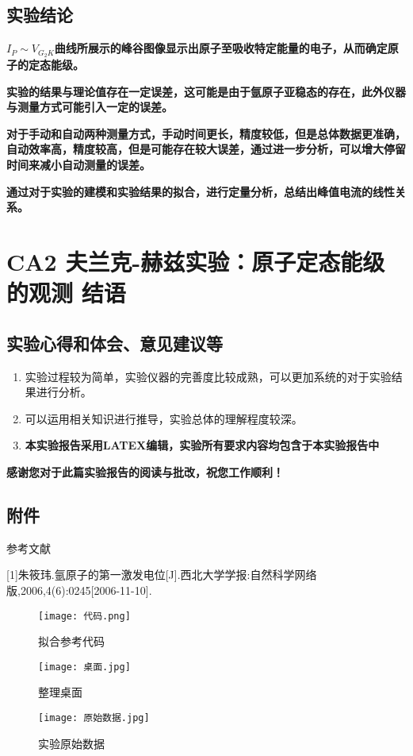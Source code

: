 \documentclass[dvipsnames, svgnames,a4paper,11pt]{article}
\begin{document}
	\subsection{实验结论}
	\textbf{$I_P{\sim}V_{G_2K}$曲线所展示的峰谷图像显示出原子至吸收特定能量的电子，从而确定原子的定态能级。}
	

	\textbf{实验的结果与理论值存在一定误差，这可能是由于氩原子亚稳态的存在，此外仪器与测量方式可能引入一定的误差。}

	\textbf{对于手动和自动两种测量方式，手动时间更长，精度较低，但是总体数据更准确，自动效率高，精度较高，但是可能存在较大误差，通过进一步分析，可以增大停留时间来减小自动测量的误差。}

	\textbf{通过对于实验的建模和实验结果的拟合，进行定量分析，总结出峰值电流的线性关系。}
	\clearpage
	
	\section{CA2 夫兰克-赫兹实验：原子定态能级的观测  \quad\heiti 结语}
	
	\subsection{实验心得和体会、意见建议等}
	\begin{enumerate}
		\item 实验过程较为简单，实验仪器的完善度比较成熟，可以更加系统的对于实验结果进行分析。
		\item 可以运用相关知识进行推导，实验总体的理解程度较深。\item \textbf{本实验报告采用LATEX编辑，实验所有要求内容均包含于本实验报告中}
	\end{enumerate}
	\quad \large \textbf{感谢您对于此篇实验报告的阅读与批改，祝您工作顺利！}
	

	\subsection{附件}
	参考文献

	[1]朱筱玮.氩原子的第一激发电位[J].西北大学学报:自然科学网络版,2006,4(6):0245[2006-11-10].

	\begin{figure}[H]
		\begin{minipage}[b]{0.3\linewidth}
		  \centering
		  \texttt{[image: 代码.png]}
		  \caption{拟合参考代码}
		\end{minipage}
		\hfill
		\begin{minipage}[b]{0.3\linewidth}
		  \centering
		  \texttt{[image: 桌面.jpg]}
		  \caption{整理桌面}
		\end{minipage}
		\hfill
		\begin{minipage}[b]{0.3\linewidth}
		  \centering
		  \texttt{[image: 原始数据.jpg]}
		  \caption{实验原始数据}
		\end{minipage}
	\end{figure}
	
	
\end{document}
